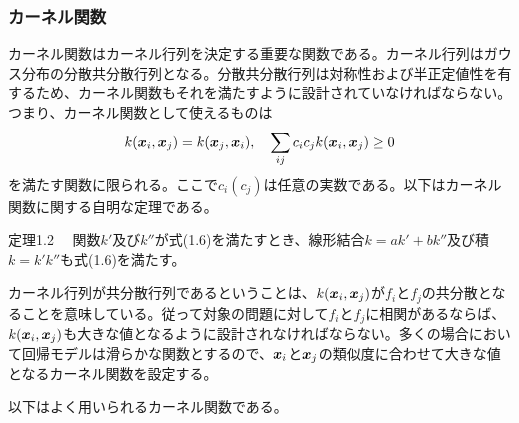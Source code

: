 \documentclass[dvipdfmx, 9pt, a4paper]{jsarticle}
\numberwithin{equation}{section}
\newcommand{\bm}[1]{{\mbox{\boldmath $#1$}}}
\begin{document}
\subsubsection{カーネル関数}
カーネル関数はカーネル行列を決定する重要な関数である。カーネル行列はガウス分布の分散共分散行列となる。分散共分散行列は対称性および半正定値性を有するため、カーネル関数もそれを満たすように設計されていなければならない。つまり、カーネル関数として使えるものは
\begin{equation}
k(\bm x_i, \bm x_j)=k(\bm x_j, \bm x_i), ~~~\sum_{ij}c_ic_jk(\bm x_i, \bm x_j) \geq 0
\end{equation}
を満たす関数に限られる。ここで$c_i(c_j)$は任意の実数である。以下はカーネル関数に関する自明な定理である。
\begin{itembox}[l]{定理1.2}
　関数$k'$及び$k''$が式(1.6)を満たすとき、線形結合$k=ak'+bk''$及び積$k=k'k''$も式(1.6)を満たす。
\end{itembox}\par
カーネル行列が共分散行列であるということは、$k(\bm x_i, \bm x_j)$が$f_i$と$f_j$の共分散となることを意味している。従って対象の問題に対して$f_i$と$f_j$に相関があるならば、$k(\bm x_i, \bm x_j)$も大きな値となるように設計されなければならない。多くの場合において回帰モデルは滑らかな関数とするので、$\bm x_i$と$\bm x_j$の類似度に合わせて大きな値となるカーネル関数を設定する。\par
以下はよく用いられるカーネル関数である。
\end{document}
